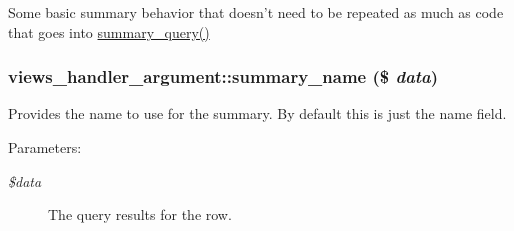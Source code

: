 Some basic summary behavior that doesn't need to be repeated as much as code that goes into \hyperlink{classviews__handler__argument_1dd6cc301b1c7c1c6829c59eb641a883}{summary\_\-query()} \hypertarget{classviews__handler__argument_4c55a340453eed4d35c69f7ac790cac1}{
\subsubsection[{summary\_\-name}]{\setlength{\rightskip}{0pt plus 5cm}views\_\-handler\_\-argument::summary\_\-name (\$ {\em data})}}
\label{classviews__handler__argument_4c55a340453eed4d35c69f7ac790cac1}


Provides the name to use for the summary. By default this is just the name field.

\begin{Desc}
\item[Parameters:]
\begin{description}
\item[{\em \$data}]The query results for the row. \end{description}
\end{Desc}


